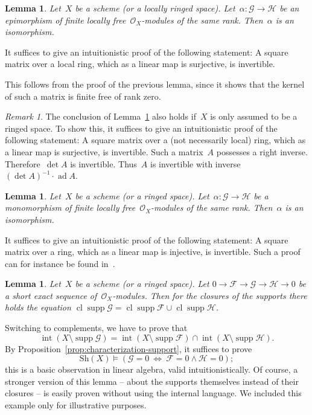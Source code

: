 \documentclass[10pt,reqno,a4paper]{amsbook}
\makeatletter
\theoremstyle{definition}
\theoremstyle{plain}
\newtheorem{lemma}[defn]{Lemma}
\theoremstyle{remark}
\newtheorem{rem}[defn]{Remark}
\newcommand{\F}{\mathcal{F}}
\renewcommand{\G}{\mathcal{G}}
\renewcommand{\H}{\mathcal{H}}
\renewcommand{\O}{\mathcal{O}}
\newcommand{\Sh}{\mathrm{Sh}}
\DeclareMathOperator{\Int}{int}
\DeclareMathOperator{\Clos}{cl}
\DeclareMathOperator{\supp}{supp}
\newcommand{\?}{\,{:}\,}
\renewcommand{\_}{\mathpunct{.}\,}
\renewenvironment{proof}[1][\proofname]{\par
  \pushQED{\qed}%
  \normalfont \topsep6\p@\@plus6\p@\relax
  \trivlist
  \item[\hskip\labelsep
        \itshape
    #1\@addpunct{.}]\ignorespaces
}{%
  \popQED\endtrivlist\@endpefalse
}
\makeatother
\begin{document}
\begin{lemma}\label{lemma:epi-iso}Let~$X$ be a scheme (or a locally ringed space). Let~$\alpha : \G
\to \H$ be an epimorphism of finite locally free~$\O_X$-modules of the same
rank. Then~$\alpha$ is an isomorphism.\end{lemma}
\begin{proof}It suffices to give an intuitionistic proof of the following
statement: A square matrix over a local ring, which as a linear map is
surjective, is invertible.

This follows from the proof of the previous lemma, since it shows that the
kernel of such a matrix is finite free of rank zero.
\end{proof}

\begin{rem}The conclusion of Lemma~\ref{lemma:epi-iso} also holds if~$X$ is
only assumed to be a ringed space. To show this, it suffices to give an
intuitionistic proof of the following statement: A square matrix over a (not
necessarily local) ring, which as a linear map is surjective, is invertible.
Such a matrix~$A$ possesses a right inverse. Therefore~$\det A$ is invertible.
Thus~$A$ is invertible with inverse~$(\det A)^{-1} \cdot \operatorname{ad} A$.
\end{rem}

\begin{lemma}\label{lemma:mono-iso}Let~$X$ be a scheme (or a ringed space).
Let~$\alpha : \G \to \H$ be a monomorphism of finite locally
free~$\O_X$-modules of the same rank. Then~$\alpha$ is an
isomorphism.\end{lemma}

\begin{proof}It suffices to give an intuitionistic proof of the following
statement: A square matrix over a ring, which as a linear map is injective, is
invertible. Such a proof can for instance be found
in~\cite[p.~1013]{richman:trivial-rings}.
\end{proof}

\begin{lemma}Let~$X$ be a scheme (or a ringed space). Let
$0 \to \F \to \G \to \H \to 0$ be a short exact sequence of~$\O_X$-modules.
Then for the closures of the supports there holds the equation
$\Clos \supp \G = \Clos \supp \F \cup \Clos \supp \H$.
\end{lemma}
\begin{proof}Switching to complements, we have to prove that
\[ \Int(X \setminus \supp\G) = \Int(X \setminus \supp\F) \cap \Int(X \setminus
\supp\H). \]
By Proposition~\ref{prop:characterization-support}, it suffices to prove
\[ \Sh(X) \models (\G = 0\ \Longleftrightarrow\ \F = 0 \wedge \H = 0); \]
this is a basic observation in linear algebra, valid intuitionistically.
\end{proof}
Of course, a stronger version of this lemma -- about the supports themselves
instead of their closures -- is easily proven without using the internal
language. We included this example only for illustrative purposes.
\end{document}
